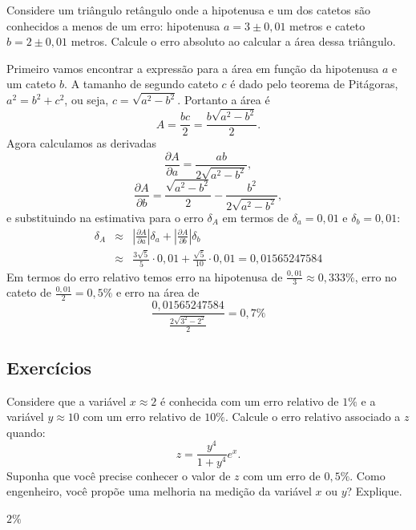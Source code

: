 \begin{ex}
Considere um triângulo retângulo onde a hipotenusa e um dos catetos são conhecidos a menos de um erro: hipotenusa $a=3\pm 0,01$ metros e cateto $b=2\pm 0,01$ metros. Calcule o erro absoluto ao calcular a área dessa triângulo.
\end{ex}
\begin{sol}
Primeiro vamos encontrar a expressão para a área em função da hipotenusa $a$ e um cateto $b$. A tamanho de segundo cateto $c$ é dado pelo teorema de Pitágoras, $a^2=b^2+c^2$, ou seja, $c=\sqrt{a^2-b^2}$. Portanto a área é $$
A=\frac{bc}{2}=\frac{b\sqrt{a^2-b^2}}{2}.
$$
Agora calculamos as derivadas
$$
\frac{\partial A}{\partial a}=\frac{ab}{2\sqrt{a^2-b^2}},
$$
$$
\frac{\partial A}{\partial b}=\frac{\sqrt{a^2-b^2}}{2}-\frac{b^2}{2\sqrt{a^2-b^2}},
$$
e substituindo na estimativa para o erro $\delta_A$ em termos de $\delta_a=0,01$ e $\delta_b=0,01$:
\begin{eqnarray*}
\delta_A&\approx & \left|\frac{\partial A}{\partial a}\right|\delta_a+\left|\frac{\partial A}{\partial b}\right|\delta_b\\
&\approx &\frac{3\sqrt{5}}{5}\cdot 0,01+\frac{\sqrt{5}}{10}\cdot 0,01=0,01565247584
\end{eqnarray*}
Em termos do erro relativo temos erro na hipotenusa de $\frac{0,01}{3}\approx 0,333\%$, erro no cateto de $\frac{0,01}{2}= 0,5\%$ e erro na área de
$$
\frac{0,01565247584}{\frac{2\sqrt{3^2-2^2}}{2}}=0,7\%
$$
\end{sol}

\subsection{Exercícios}

\begin{Exercise}Considere que a variável $x\approx 2$ é conhecida com um erro relativo de $1\%$ e a variável $y\approx 10$ com um erro relativo de $10\%$. Calcule o erro relativo associado a $z$ quando:
  \begin{equation*}
    z=\frac{y^4}{1+y^4}e^x.  
  \end{equation*}
Suponha que você precise conhecer o valor de $z$ com um erro de $0,5\%$. Como engenheiro, você propõe uma melhoria na medição da variável $x$ ou $y$? Explique.
\end{Exercise}
\begin{Answer}
  \begin{tiny}
    $2\%$    
  \end{tiny}
\end{Answer}

